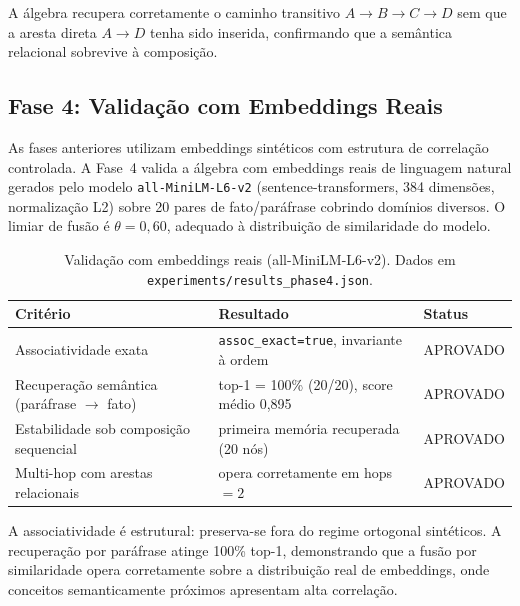 \documentclass[11pt,a4paper]{article}
\theoremstyle{definition}
\begin{document}
A \'algebra recupera corretamente o caminho transitivo $A \to B \to C \to D$ sem que a aresta direta $A \to D$ tenha sido inserida, confirmando que a sem\^antica relacional sobrevive \`a composi\c{c}\~ao.

\subsection{Fase 4: Valida\c{c}\~ao com Embeddings Reais}

As fases anteriores utilizam embeddings sint\'eticos com estrutura de correla\c{c}\~ao controlada. A Fase~4 valida a \'algebra com embeddings reais de linguagem natural gerados pelo modelo \texttt{all-MiniLM-L6-v2} (sentence-transformers, 384 dimens\~oes, normaliza\c{c}\~ao L2) sobre 20 pares de fato/par\'afrase cobrindo dom\'inios diversos. O limiar de fus\~ao \'e $\theta = 0{,}60$, adequado \`a distribui\c{c}\~ao de similaridade do modelo.

\begin{table}[h]
\centering
\begin{tabular}{lll}
\toprule
\textbf{Crit\'erio} & \textbf{Resultado} & \textbf{Status} \\
\midrule
Associatividade exata & \texttt{assoc\_exact=true}, invariante \`a ordem & APROVADO \\
Recupera\c{c}\~ao sem\^antica (par\'afrase $\to$ fato) & top-1 = 100\% (20/20), score m\'edio 0,895 & APROVADO \\
Estabilidade sob composi\c{c}\~ao sequencial & primeira mem\'oria recuperada (20 n\'os) & APROVADO \\
Multi-hop com arestas relacionais & opera corretamente em hops $= 2$ & APROVADO \\
\bottomrule
\end{tabular}
\caption{Valida\c{c}\~ao com embeddings reais (all-MiniLM-L6-v2). Dados em \texttt{experiments/results\_phase4.json}.}
\end{table}

A associatividade \'e estrutural: preserva-se fora do regime ortogonal sint\'eticos. A recupera\c{c}\~ao por par\'afrase atinge 100\% top-1, demonstrando que a fus\~ao por similaridade opera corretamente sobre a distribui\c{c}\~ao real de embeddings, onde conceitos semanticamente pr\'oximos apresentam alta correla\c{c}\~ao.
\end{document}
